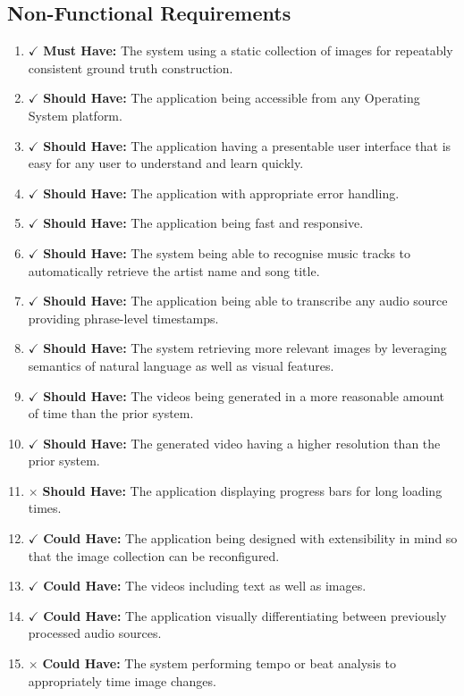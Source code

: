 \documentclass{l4proj}
\begin{document}
\subsection{Non-Functional Requirements}
\begin{enumerate}[resume]
    \item {\color{forestgreen} $\checkmark$ \textbf{Must Have:} The system using a static collection of images for repeatably consistent ground truth construction.}
    \item {\color{forestgreen} $\checkmark$ \textbf{Should Have:} The application being accessible from any Operating System platform.}
    \item {\color{forestgreen} $\checkmark$ \textbf{Should Have:} The application having a presentable user interface that is easy for any user to understand and learn quickly.}
    \item {\color{forestgreen} $\checkmark$ \textbf{Should Have:} The application with appropriate error handling.}
    \item {\color{forestgreen} $\checkmark$ \textbf{Should Have:} The application being fast and responsive.}
    \item {\color{forestgreen} $\checkmark$ \textbf{Should Have:} The system being able to recognise music tracks to automatically retrieve the artist name and song title.}
    \item {\color{forestgreen} $\checkmark$ \textbf{Should Have:} The application being able to transcribe any audio source providing phrase-level timestamps.}
    \item {\color{forestgreen} $\checkmark$ \textbf{Should Have:} The system retrieving more relevant images by leveraging semantics of natural language as well as visual features.}
    \item {\color{forestgreen} $\checkmark$ \textbf{Should Have:} The videos being generated in a more reasonable amount of time than the prior system.}
    \item {\color{forestgreen} $\checkmark$ \textbf{Should Have:} The generated video having a higher resolution than the prior system.}
    \item \label{reqs:28} {\color{brickred} $\times$  \textbf{Should Have:} The application displaying progress bars for long loading times.}
    \item {\color{forestgreen} $\checkmark$ \textbf{Could Have:} The application being designed with extensibility in mind so that the image collection can be reconfigured.}
    \item {\color{forestgreen} $\checkmark$ \textbf{Could Have:} The videos including text as well as images.}
    \item {\color{forestgreen} $\checkmark$ \textbf{Could Have:} The application visually differentiating between previously processed audio sources.}
    \item \label{reqs:32} {\color{brickred} $\times$  \textbf{Could Have:} The system performing tempo or beat analysis to appropriately time image changes.}
\end{enumerate}
\end{document}
